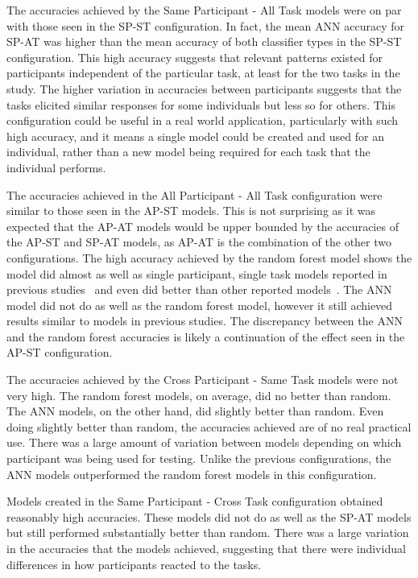 \documentclass[11pt]{article}
\begin{document}
	The accuracies achieved by the Same Participant - All Task models were on par with those seen in the SP-ST configuration. In fact, the mean ANN accuracy for SP-AT was higher than the mean accuracy of both classifier types in the SP-ST configuration.  This high accuracy suggests that relevant patterns existed for participants independent of the particular task, at least for the two tasks in the study. The higher variation in accuracies between participants suggests that the tasks elicited similar responses for some individuals but less so for others. This configuration could be useful in a real world application, particularly with such high accuracy, and it means a single model could be created and used for an individual, rather than a new model being required for each task that the individual performs. 
	
	The accuracies achieved in the All Participant  - All Task configuration were similar to those seen in the AP-ST models. This is not surprising as it was expected that the AP-AT models would be upper bounded by the accuracies of the AP-ST and SP-AT models, as AP-AT is the combination of the other two configurations. The high accuracy achieved by the random forest model shows the model did almost as well as single participant, single task models reported in previous studies~\cite{Yin} and even did better than other reported models~\cite{Zhang}. The ANN model did not do as well as the random forest model, however it still achieved results similar to models in previous studies. The discrepancy between the ANN and the random forest accuracies is likely a continuation of the effect seen in the AP-ST configuration.
	
	The accuracies achieved by the Cross Participant - Same Task models were not very high. The random forest models, on average, did no better than random. The ANN models, on the other hand, did slightly better than random. Even doing slightly better than random, the accuracies achieved are of no real practical use. There was a large amount of variation between models depending on which participant was being used for testing. Unlike the previous configurations, the ANN models outperformed the random forest models in this configuration.
	
	Models created in the Same Participant - Cross Task configuration obtained reasonably high accuracies. These models did not do as well as the SP-AT models but still performed substantially better than random. There was a large variation in the accuracies that the models achieved, suggesting that there were individual differences in how participants reacted to the tasks. 
	
\end{document}
